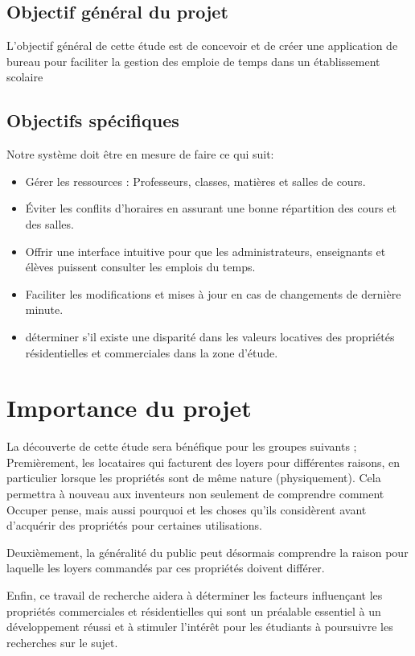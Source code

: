\documentclass[english,12pt,a4paper]{report}
\begin{document}
\subsection{Objectif général du projet}

L'objectif général de cette étude est de concevoir et de créer une application de bureau pour faciliter la gestion des emploie de temps dans un établissement scolaire

\subsection{Objectifs spécifiques}
Notre système doit être en mesure de faire ce qui suit:
\begin{itemize}
	\item Gérer les ressources : Professeurs, classes, matières et salles de cours.
	\item Éviter les conflits d’horaires en assurant une bonne répartition des cours et des salles.
	\item Offrir une interface intuitive pour que les administrateurs, enseignants et élèves puissent consulter les emplois du temps.
	\item Faciliter les modifications et mises à jour en cas de changements de dernière minute.
	\item déterminer s'il existe une disparité dans les valeurs locatives des propriétés résidentielles et commerciales dans la zone d'étude.
	
\end{itemize}


\section{Importance du projet }
La découverte de cette étude sera bénéfique pour les groupes suivants ; Premièrement, les locataires qui facturent des loyers pour différentes raisons, en particulier lorsque les propriétés sont de même nature (physiquement). Cela permettra à nouveau aux inventeurs non seulement de comprendre comment Occuper pense, mais aussi pourquoi et les choses qu'ils considèrent avant d'acquérir des propriétés pour certaines utilisations.

 Deuxièmement, la généralité du public peut désormais comprendre la raison pour laquelle les loyers commandés par ces propriétés doivent différer. 
 
 Enfin, ce travail de recherche aidera à déterminer les facteurs influençant les propriétés commerciales et résidentielles qui sont un préalable essentiel à un développement réussi et à stimuler l'intérêt pour les étudiants à poursuivre les recherches sur le sujet.
\end{document}
